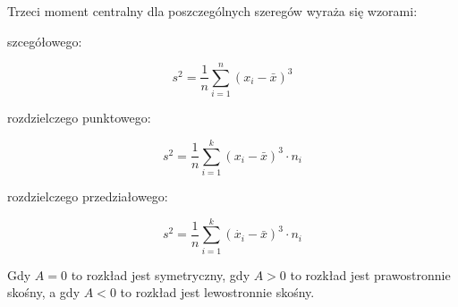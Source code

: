 \documentclass[../Matematyka.tex]{subfiles}
\begin{document}
Trzeci moment centralny dla poszczególnych szeregów wyraża się wzorami:
\begin{multicols}{3}
    \begin{center}szcegółowego:\end{center}
    \[s^2=\frac{1}{n}\sum_{i=1}^{n}(x_i - \bar{x})^3\]
    \begin{center}rozdzielczego punktowego:\end{center}
    \[s^2=\frac{1}{n}\sum_{i=1}^{k}(x_i - \bar{x})^3 \cdot n_i\]
    \begin{center}rozdzielczego przedziałowego:\end{center}
    \[s^2=\frac{1}{n}\sum_{i=1}^{k}(\dot{x_i} - \bar{x})^3 \cdot n_i\]
\end{multicols}

Gdy \(A = 0\) to rozkład jest symetryczny, gdy \(A > 0\) to rozkład jest prawostronnie skośny, a gdy \(A < 0\) to rozkład jest lewostronnie skośny.
\end{document}
